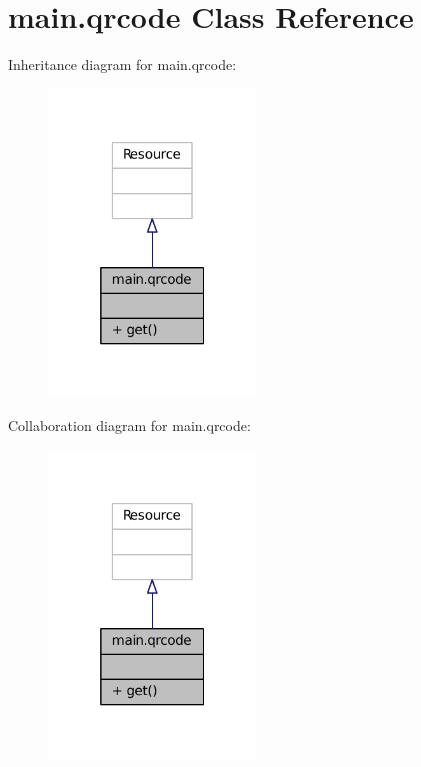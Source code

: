 \hypertarget{classmain_1_1qrcode}{}\section{main.\+qrcode Class Reference}
\label{classmain_1_1qrcode}


Inheritance diagram for main.\+qrcode\+:
\nopagebreak
\begin{figure}[H]
\begin{center}
\leavevmode
\includegraphics[width=157pt]{classmain_1_1qrcode__inherit__graph}
\end{center}
\end{figure}


Collaboration diagram for main.\+qrcode\+:
\nopagebreak
\begin{figure}[H]
\begin{center}
\leavevmode
\includegraphics[width=157pt]{classmain_1_1qrcode__coll__graph}
\end{center}
\end{figure}

